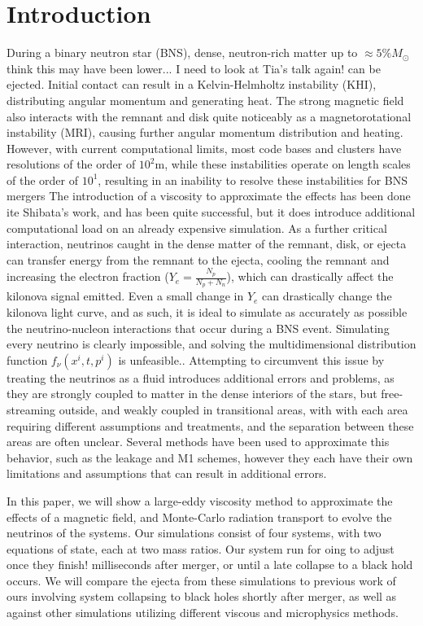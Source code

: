 \documentclass[%
twocolumn,
superscriptaddress,
nofootinbib,
 amsmath,amssymb,
 aps, prd
]{revtex4-2}
\newcommand{\alex}[1]{\color{red}{#1}}
\newcommand{\ye}[0]{$Y_e$ }
\begin{document}
\section{Introduction}
During a binary neutron star (BNS), dense, neutron-rich matter up to $\approx5\%M_\odot$ {\alex I think this may have been lower... I need to look at Tia's talk again!} can be ejected. 
Initial contact can result in a Kelvin-Helmholtz instability (KHI), distributing angular momentum and generating heat. 
The strong magnetic field also interacts with the remnant and disk quite noticeably as a magnetorotational instability (MRI), causing further angular momentum distribution and heating.
However, with current computational limits, most code bases and clusters have resolutions of the order of $10^2$m, while these instabilities operate on length scales of the order of $10^1$, resulting in an inability to resolve these instabilities for BNS mergers
The introduction of a viscosity to approximate the effects has been done {\alex cite Shibata's work}, and has been quite successful, but it does introduce additional computational load on an already expensive simulation.
As a further critical interaction, neutrinos caught in the dense matter of the remnant, disk, or ejecta can transfer energy from the remnant to the ejecta, cooling the remnant and increasing the electron fraction ($Y_e=\frac{N_p}{N_p+N_n}$), which can drastically affect the kilonova signal emitted.
Even a small change in \ye can drastically change the kilonova light curve, and as such, it is ideal to simulate as accurately as possible the neutrino-nucleon interactions that occur during a BNS event.
Simulating every neutrino is clearly impossible, and solving the multidimensional distribution function $f_\nu(x^i,t,p^i)$ is unfeasible..
Attempting to circumvent this issue by treating the neutrinos as a fluid introduces additional errors and problems, as they are strongly coupled to matter in the dense interiors of the stars, but free-streaming outside, and weakly coupled in transitional areas, with with each area requiring different assumptions and treatments, and the separation between these areas are often unclear.
Several methods have been used to approximate this behavior, such as the leakage and M1 schemes, however they each have their own limitations and assumptions that can result in additional errors.

In this paper, we will show a large-eddy viscosity method to approximate the effects of a magnetic field, and Monte-Carlo radiation transport to evolve the neutrinos of the systems.
Our simulations consist of four systems, with two equations of state, each at two mass ratios.
Our system run for {\alex going to adjust once they finish!} milliseconds after merger, or until a late collapse to a black hold occurs. 
We will compare the ejecta from these simulations to previous work of ours involving system collapsing to black holes shortly after merger, as well as against other simulations utilizing different viscous and microphysics methods.
\end{document}
